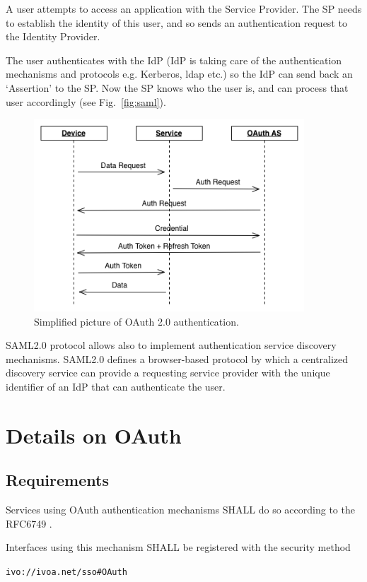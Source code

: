 \documentclass[11pt,a4paper]{ivoa}
\begin{document}
{{{A user attempts to access an application with the Service Provider.
The SP needs to establish the identity of this user, and so sends an authentication request to the Identity Provider.

The user authenticates with the IdP (IdP is taking care of the authentication mechanisms and protocols e.g. Kerberos, ldap etc.) so the IdP can send back an `Assertion' to the SP.
Now the SP knows who the user is, and can process that user accordingly (see Fig.~\ref{fig:saml}).
\begin{figure}
\centering
\includegraphics[width=0.9\textwidth]{SSO_image003.png}
\caption{Simplified picture of OAuth 2.0 authentication.}
\label{fig:oauth}
\end{figure}

SAML2.0 protocol allows also to implement authentication service discovery mechanisms. SAML2.0  defines a browser-based protocol
by which a centralized discovery service can provide a requesting service provider with the unique identifier of an
IdP that can authenticate the user.


\section{Details on OAuth}
\subsection{Requirements}
Services using OAuth authentication mechanisms SHALL do so according to the RFC6749 \citep{std:RFC6749}.

Interfaces using this mechanism SHALL  be registered with the security method

\texttt{ivo://ivoa.net/sso\#OAuth}


}}}
\end{document}
